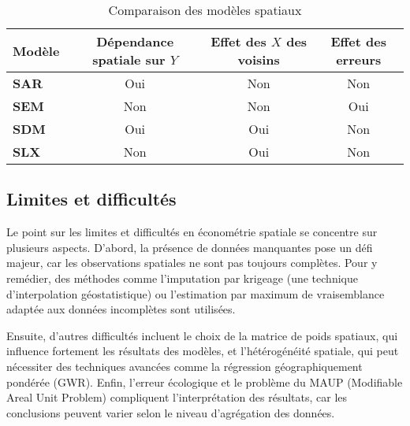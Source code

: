 \documentclass[
]{article}
\begin{document}
\begin{table}[h]
    \centering
    \begin{tabular}{|l|c|c|c|}
        \hline
        \textbf{Modèle} & \textbf{Dépendance spatiale sur \( Y \)} & \textbf{Effet des \( X \) des voisins} & \textbf{Effet des erreurs} \\
        \hline
        \textbf{SAR}  & Oui  & Non  & Non \\
        \hline
        \textbf{SEM}  & Non  & Non  & Oui \\
        \hline
        \textbf{SDM}  & Oui  & Oui  & Non \\
        \hline
        \textbf{SLX}  & Non  & Oui  & Non \\
        \hline
    \end{tabular}
    \caption{Comparaison des modèles spatiaux}
    \label{tab:comparaison_modeles}
\end{table}

\subsection{Limites et difficultés}\label{limites-et-difficultuxe9s}

Le point sur les limites et difficultés en économétrie spatiale se
concentre sur plusieurs aspects. D'abord, la présence de données
manquantes pose un défi majeur, car les observations spatiales ne sont
pas toujours complètes. Pour y remédier, des méthodes comme l'imputation
par krigeage (une technique d'interpolation géostatistique) ou
l'estimation par maximum de vraisemblance adaptée aux données
incomplètes sont utilisées.

Ensuite, d'autres difficultés incluent le choix de la matrice de poids
spatiaux, qui influence fortement les résultats des modèles, et
l'hétérogénéité spatiale, qui peut nécessiter des techniques avancées
comme la régression géographiquement pondérée (GWR). Enfin, l'erreur
écologique et le problème du MAUP (Modifiable Areal Unit Problem)
compliquent l'interprétation des résultats, car les conclusions peuvent
varier selon le niveau d'agrégation des données.
\end{document}
